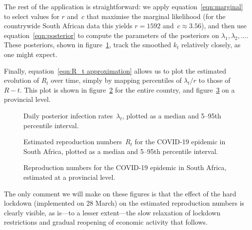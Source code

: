 \documentclass[12pt,a4paper]{article}
\begin{document}
The rest of the application is straightforward: we apply
equation~\eqref{eqn:marginal} to select values for $r$ and~$c$ that maximise the
marginal likelihood (for the countrywide South African data this yields $r =
1592$ and~$c \approx 3.56$), and then use equation~\ref{eqn:posterior} to
compute the parameters of the posteriors on $\lambda_1, \lambda_2, \dots$. These
posteriors, shown in figure~\ref{fig:posterior}, track the smoothed $k_t$
relatively closely, as one might expect.

Finally, equation~\eqref{eqn:R_t approximation} allows us to plot the estimated
evolution of $R_t$ over time, simply by mapping percentiles of $\lambda_t/r$ to
those of~$R-t$. This plot is shown in figure~\ref{fig:countrywide} for the
entire country, and figure~\ref{fig:provincial} on a provincial level.

\begin{figure}[htbp]
  \centering
  \caption{Daily posterior infection rates~$\lambda_t$, plotted as a median and
    5--95th percentile interval.}
  \label{fig:posterior}
\end{figure}

\begin{figure}[htbp]
  \centering
  \caption{Estimated reproduction numbers~$R_t$ for the COVID-19 epidemic in
    South Africa, plotted as a median and 5--95th percentile interval.}
  \label{fig:countrywide}
\end{figure}

\begin{figure}[htbp]
  \centering
  \caption{Reproduction numbers for the COVID-19 epidemic in South Africa,
    estimated at a provincial level.}
  \label{fig:provincial}
\end{figure}

The only comment we will make on these figures is that the effect of the hard
lockdown (implemented on 28 March) on the estimated reproduction numbers is
clearly visible, as is---to a lesser extent---the slow relaxation of lockdown
restrictions and gradual reopening of economic activity that follows.


\printbibliography
\end{document}
